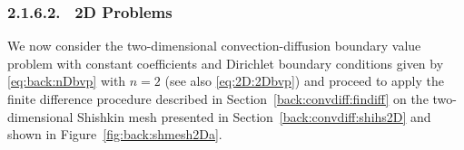 \subsubsection{2.1.6.2. \ 2D Problems}
We now consider the two-dimensional convection-diffusion boundary value
problem with constant coefficients and Dirichlet boundary conditions given by
\eqref{eq:back:nDbvp} with $n=2$ (see also \eqref{eq:2D:2Dbvp}) and proceed to
apply the finite difference procedure described in Section~\ref{back:convdiff:findiff} on the two-dimensional
Shishkin mesh presented in Section~\ref{back:convdiff:shihs2D} and shown in
Figure~\ref{fig:back:shmesh2Da}.

%
%
